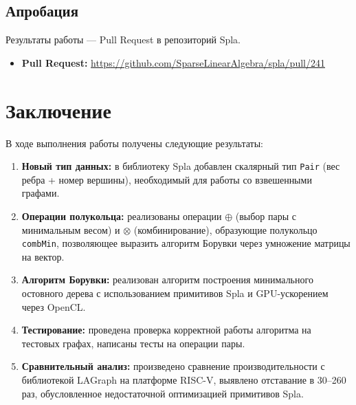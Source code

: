 \documentclass[a4paper]{article}
\begin{document}
\subsection{Апробация}

Результаты работы --- Pull Request в репозиторий Spla.
\begin{itemize}
    \item \textbf{Pull Request:} \url{https://github.com/SparseLinearAlgebra/spla/pull/241}
\end{itemize}
\section{Заключение}

В ходе выполнения работы получены следующие результаты:

\begin{enumerate}
    \item \textbf{Новый тип данных:} в библиотеку Spla добавлен скалярный тип \texttt{Pair} (вес ребра + номер вершины), необходимый для работы со взвешенными графами.
    
    \item \textbf{Операции полукольца:} реализованы операции $\oplus$ (выбор пары с минимальным весом) и $\otimes$ (комбинирование), образующие полукольцо \texttt{combMin}, позволяющее выразить алгоритм Борувки через умножение матрицы на вектор.
    
    \item \textbf{Алгоритм Борувки:} реализован алгоритм построения минимального остовного дерева с использованием примитивов Spla и GPU-ускорением через OpenCL.
    
    \item \textbf{Тестирование:} проведена проверка корректной работы алгоритма на тестовых графах, написаны тесты на операции пары.
    
    \item \textbf{Сравнительный анализ:} произведено сравнение производительности с библиотекой LAGraph на платформе RISC-V, выявлено отставание в 30–260 раз, обусловленное недостаточной оптимизацией примитивов Spla.
\end{enumerate}
\end{document}

